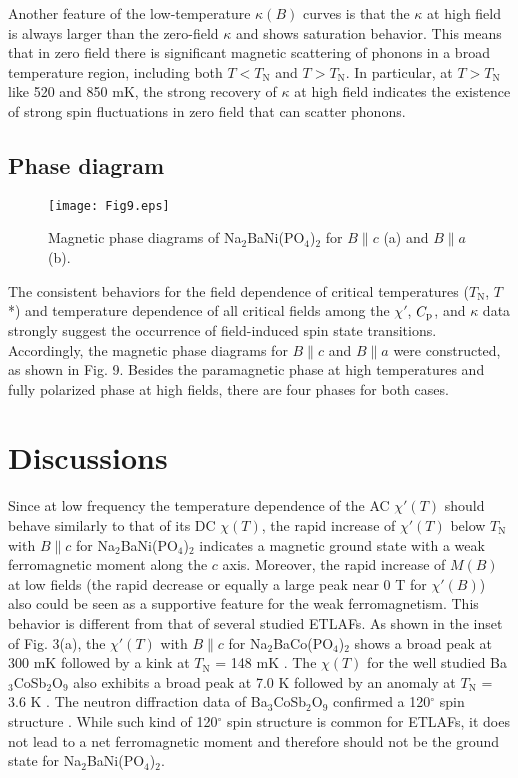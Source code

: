 \documentclass[aps,twocolumn,superscriptaddress,showpacs]{revtex4-1}
\begin{document}
Another feature of the low-temperature $\kappa(B)$ curves is that the $\kappa$ at high field is always larger than the zero-field $\kappa$ and shows saturation behavior. This means that in zero field there is significant magnetic scattering of phonons in a broad temperature region, including both $T < T_{\text{N}}$ and $T > T_{\text{N}}$. In particular, at $T > T_{\text{N}}$ like 520 and 850 mK, the strong recovery of $\kappa$ at high field indicates the existence of strong spin fluctuations in zero field that can scatter phonons.

\subsection{Phase diagram}

\begin{figure}
\texttt{[image: Fig9.eps]}
\caption{Magnetic phase diagrams of Na$_2$BaNi(PO$_4$)$_2$ for $B \parallel c$ (a) and $B \parallel a$ (b).}
\label{phase diagram}
\end{figure}

The consistent behaviors for the field dependence of critical temperatures ($T_{\text{N}}$, $T$*) and temperature dependence of all critical fields among the $\chi'$, $C\rm_{p}$, and $\kappa$ data strongly suggest the occurrence of field-induced spin state transitions. Accordingly, the magnetic phase diagrams for $B \parallel c$ and $B \parallel a$ were constructed, as shown in Fig. 9. Besides the paramagnetic phase at high temperatures and fully polarized phase at high fields, there are four phases for both cases.

\section{Discussions}

Since at low frequency the temperature dependence of the AC $\chi'(T)$ should behave similarly to that of its DC $\chi(T)$, the rapid increase of $\chi'(T)$ below $T_{\text{N}}$ with $B \parallel c$ for Na$_2$BaNi(PO$_4$)$_2$ indicates a magnetic ground state with a weak ferromagnetic moment along the $c$ axis. Moreover, the rapid increase of $M(B)$  at low fields (the rapid decrease or equally a large peak near 0 T for $\chi'(B)$) also could be seen as a supportive feature for the weak ferromagnetism. This behavior is different from that of several studied ETLAFs. As shown in the inset of Fig. 3(a), the $\chi'(T)$ with $B \parallel c$ for Na$_2$BaCo(PO$_4$)$_2$ shows a broad peak at 300 mK followed by a kink at $T_{\text{N}}$ = 148 mK \cite{li2020possible}. The $\chi(T)$ for the well studied Ba$_3$CoSb$_2$O$_9$ also exhibits a broad peak at 7.0 K followed by an anomaly at $T_{\text{N}}$ = 3.6 K \cite{zhou2012successive}. The neutron diffraction data of Ba$_3$CoSb$_2$O$_9$ confirmed a 120$^\circ$ spin structure \cite{PhysRevLett.116.087201}. While such kind of 120$^\circ$ spin structure is common for ETLAFs, it does not lead to a net ferromagnetic moment and therefore should not be the ground state for Na$_2$BaNi(PO$_4$)$_2$.
\end{document}
